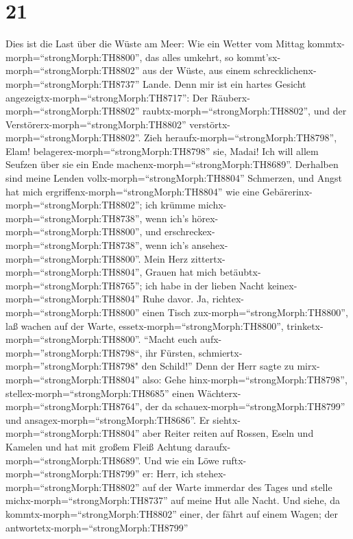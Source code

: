 \hypertarget{section-20}{%
\section{21}\label{section-20}}

 Dies ist die Last über die Wüste am Meer: Wie ein Wetter
vom Mittag kommtx-morph=``strongMorph:TH8800'', das alles umkehrt, so
kommt'sx-morph=``strongMorph:TH8802'' aus der Wüste, aus einem
schrecklichenx-morph=``strongMorph:TH8737'' Lande.  Denn mir
ist ein hartes Gesicht angezeigtx-morph=``strongMorph:TH8717'': Der
Räuberx-morph=``strongMorph:TH8802''
raubtx-morph=``strongMorph:TH8802'', und der
Verstörerx-morph=``strongMorph:TH8802''
verstörtx-morph=``strongMorph:TH8802''. Zieh
heraufx-morph=``strongMorph:TH8798'', Elam!
belagerex-morph=``strongMorph:TH8798'' sie, Madai! Ich will allem
Seufzen über sie ein Ende machenx-morph=``strongMorph:TH8689''.
 Derhalben sind meine Lenden
vollx-morph=``strongMorph:TH8804'' Schmerzen, und Angst hat mich
ergriffenx-morph=``strongMorph:TH8804'' wie eine
Gebärerinx-morph=``strongMorph:TH8802''; ich krümme
michx-morph=``strongMorph:TH8738'', wenn ich's
hörex-morph=``strongMorph:TH8800'', und
erschreckex-morph=``strongMorph:TH8738'', wenn ich's
ansehex-morph=``strongMorph:TH8800''.  Mein Herz
zittertx-morph=``strongMorph:TH8804'', Grauen hat mich
betäubtx-morph=``strongMorph:TH8765''; ich habe in der lieben Nacht
keinex-morph=``strongMorph:TH8804'' Ruhe davor.  Ja,
richtex-morph=``strongMorph:TH8800'' einen Tisch
zux-morph=``strongMorph:TH8800'', laß wachen auf der Warte,
essetx-morph=``strongMorph:TH8800'',
trinketx-morph=``strongMorph:TH8800''. ``Macht euch
aufx-morph=''strongMorph:TH8798``, ihr Fürsten,
schmiertx-morph=''strongMorph:TH8798" den Schild!''  Denn
der Herr sagte zu mirx-morph=``strongMorph:TH8804'' also: Gehe
hinx-morph=``strongMorph:TH8798'', stellex-morph=``strongMorph:TH8685''
einen Wächterx-morph=``strongMorph:TH8764'', der da
schauex-morph=``strongMorph:TH8799'' und
ansagex-morph=``strongMorph:TH8686''.  Er
siehtx-morph=``strongMorph:TH8804'' aber Reiter reiten auf Rossen, Eseln
und Kamelen und hat mit großem Fleiß Achtung
daraufx-morph=``strongMorph:TH8689''.  Und wie ein Löwe
ruftx-morph=``strongMorph:TH8799'' er: Herr, ich
stehex-morph=``strongMorph:TH8802'' auf der Warte immerdar des Tages und
stelle michx-morph=``strongMorph:TH8737'' auf meine Hut alle Nacht.
 Und siehe, da kommtx-morph=``strongMorph:TH8802'' einer,
der fährt auf einem Wagen; der antwortetx-morph=``strongMorph:TH8799''
